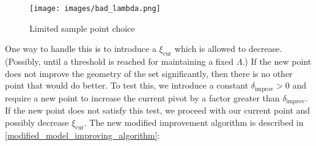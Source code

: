 \begin{figure}[h]
    \centering
    \texttt{[image: images/bad\_lambda.png]}
    \caption{Limited sample point choice}
    \label{lspc}
\end{figure}


One way to handle this is to introduce a $\xi_{\text{cur}}$ which is allowed to decrease.
(Possibly, until a threshold is reached for maintaining a fixed $\Lambda$.)
If the new point does not improve the geometry of the set significantly, then there is no other point that would do better.
To test this, we introduce a constant $\delta_{\text{improv}}>0$ and require a new point to increase the current pivot by a factor greater than $\delta_{\text{improv}}$.
If the new point does not satisfy this test, we proceed with our current point and possibly decrease $\xi_{\text{cur}}$.
The new modified improvement algorithm is described in \cref{modified_model_improving_algorithm}:

